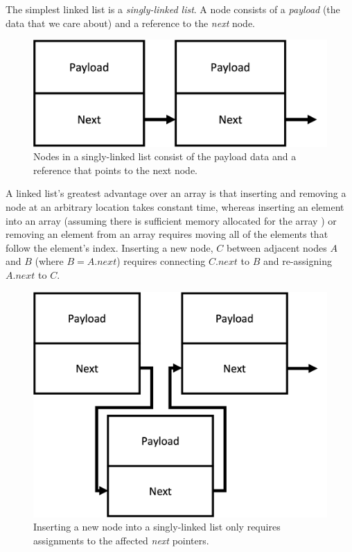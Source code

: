 The simplest linked list is a \textit{singly-linked list}. A node consists of a
\textit{payload} (the data that we care about) and a reference to the
\textit{next} node.

\begin{figure}[h]
    \centering
    \includegraphics[scale=0.5]{singly-linked-list}
    \caption{Nodes in a singly-linked list consist of the payload data and a reference that points to the next node.}
\end{figure}

A linked list's greatest advantage over an array is that inserting and removing
a node at an arbitrary location takes constant time, whereas inserting an
element into an array (assuming there is sufficient memory allocated for the
array ) or removing an element from an array requires moving all of the
elements that follow the element's index. Inserting a new node, $C$ between
adjacent nodes $A$ and $B$ (where $B = A.next$) requires connecting $C.next$ to
$B$ and re-assigning $A.next$ to $C$.

\begin{figure}[h]
    \centering
    \includegraphics[scale=0.5]{sll-insertion}
    \caption{Inserting a new node into a singly-linked list only requires assignments to the affected \textit{next} pointers.}
\end{figure}

